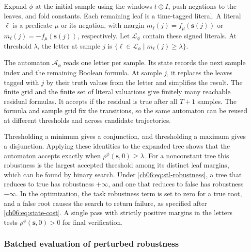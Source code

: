 \subsubsection{}
\label{ch06:subsubsec:robustness-automaton}
\begin{revision}
Expand $\phi$ at the initial sample using the windows $t\oplus I$,
push negations to the leaves, and fold constants. Each remaining leaf
is a time-tagged literal. A literal $\ell$ is a predicate $\mu$ or its
negation, with margin $m_\ell(j)=f_\mu(\mathbf{s}(j))$ or
$m_\ell(j)=-f_\mu(\mathbf{s}(j))$, respectively. Let $\mathcal{L}_\phi$
contain these signed literals. At threshold $\lambda$, the letter
at sample $j$ is $\{\ell\in\mathcal{L}_\phi\mid m_\ell(j)\geq\lambda\}$.

The automaton $\mathcal{A}_\phi$ reads one letter per sample. Its state
records the next sample index and the remaining Boolean formula.
At sample $j$, it replaces the leaves tagged with $j$ by their truth
values from the letter and simplifies the result. The finite grid and
the finite set of literal valuations give finitely many reachable
residual formulas. It accepts if the
residual is true after all $T+1$ samples. The formula and sample grid
fix the transitions, so the same automaton can be reused at different
thresholds and across candidate trajectories.

Thresholding a minimum gives a conjunction, and thresholding a maximum
gives a disjunction. Applying these identities to the expanded tree shows
that the automaton accepts exactly when $\rho^\phi(\mathbf{s},0)\geq\lambda$.
For a nonconstant tree this robustness is the largest accepted threshold
among its distinct leaf margins, which can be found by binary search.
Under \eqref{ch06:eq:stl-robustness}, a tree that reduces to true has
robustness $+\infty$, and one that reduces to false has robustness $-\infty$.
In the optimization, the task robustness term is set to zero for a true root,
and a false root causes the search to return failure, as specified after
\eqref{ch06:eq:state-cost}.
A single pass with strictly positive margins in the letters tests
$\rho^\phi(\mathbf{s},0)>0$ for final verification.
\end{revision}

\subsubsection{Batched evaluation of perturbed robustness}
\label{ch06:subsec:stl-robustness}

